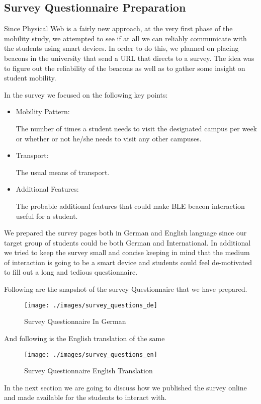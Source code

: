 \subsection{Survey Questionnaire Preparation}

Since Physical Web is a fairly new approach, at the very first phase of the mobility study, we attempted to see if at all we can reliably communicate with the students using smart devices. In order to do this, we planned on placing beacons in the university that send a URL that directs to a survey. The idea was to figure out the reliability of the beacons as well as to gather some insight on student mobility.

In the survey we focused on the following key points:
\begin{itemize}
	\item Mobility Pattern:
	\par The number of times a student needs to visit the designated campus per week or whether or not he/she needs to visit any other campuses.
	\item Transport: 
	\par The usual means of transport.
	\item Additional Features:
	\par The probable additional features that could make BLE beacon interaction useful for a student.
\end{itemize}

We prepared the survey pages both in German and English language since our target group of students could be both German and International. In additional we tried to keep the survey small and concise keeping in mind that the medium of interaction is going to be a smart device and students could feel de-motivated to fill out a long and tedious questionnaire.

Following are the snapshot of the survey Questionnaire that we have prepared.

\begin{figure}[H]
	\centering
	\texttt{[image: ./images/survey\_questions\_de]}
	\caption{Survey Questionnaire In German}
	\label{figure1:survey_german}
\end{figure}

And following is the English translation of the same
\begin{figure}[H]
	\centering
	\texttt{[image: ./images/survey\_questions\_en]}
	\caption{Survey Questionnaire English Translation}
	\label{figure1:survey_englishn}
\end{figure}

\par In the next section we are going to discuss how we published the survey online and made available for the students to interact with.
